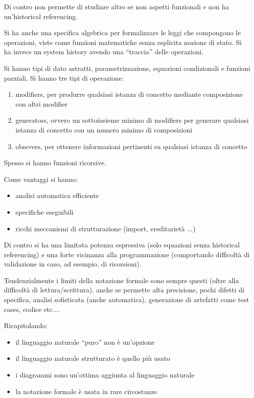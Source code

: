 Di contro non permette di studiare altro se non aspetti funzionali e non ha
un'historical referencing.

Si ha anche una specifica algebrica per formalizzare le leggi che compongono le
operazioni, viste come funzioni matematiche senza esplicita nozione di stato.
Si ha invece un system history avendo una “traccia” delle operazioni.

Si hanno tipi di dato astratti, parametrizzazione, equazioni condizionali e funzioni
parziali. Si hanno tre tipi di operazione:
\begin{enumerate}
      \item modifiers, per produrre qualsiasi istanza di concetto mediante composizione
            con altri modifier
      \item generators, ovvero un sottoinsieme minimo di modifiers per generare
            qualsiasi istanza di concetto con un numero minimo di composizioni
      \item obsevers, per ottenere informazioni pertinenti su qualsiasi istanza di
            concetto
\end{enumerate}

Spesso si hanno funzioni ricorsive.

Come vantaggi si hanno:
\begin{itemize}
      \item analisi automatica efficiente
      \item specifiche eseguibili
      \item ricchi meccanismi di strutturazione (import, ereditarietà $\dots$)
\end{itemize}

Di contro si ha una limitata potenza espressiva (solo equazioni senza historical
referencing) e una forte vicinanza alla programmazione (comportando difficoltà
di validazione in caso, ad esempio, di ricorsioni).

Tendenzialmente i limiti della notazione formale sono sempre questi (oltre alla
difficoltà di lettura/scrittura), anche se permette alta precisione, pochi difetti
di specifica, analisi sofisticata (anche automatica), generazione di artefatti
come test cases, codice etc$\dots$.

Ricapitolando:
\begin{itemize}
      \item il linguaggio naturale “puro” non è un'opzione
      \item il linguaggio naturale strutturato è quello più usato
      \item i diagrammi sono un'ottima aggiunta al linguaggio naturale
      \item la notazione formale è usata in rare circostanze
\end{itemize}
